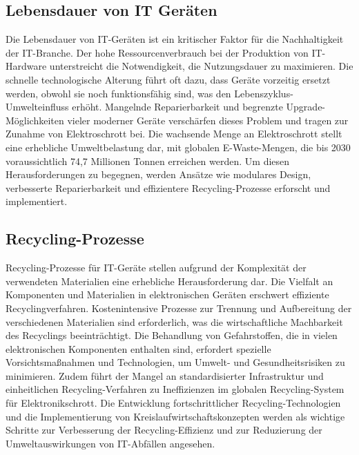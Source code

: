 \documentclass[12pt]{article}
\begin{document}
\subsection{Lebensdauer von IT Geräten}
Die Lebensdauer von IT-Geräten ist ein kritischer Faktor für die Nachhaltigkeit der IT-Branche. Der hohe Ressourcenverbrauch bei der Produktion von IT-Hardware unterstreicht die Notwendigkeit, die Nutzungsdauer zu maximieren\cite{tomlinson2010}. Die schnelle technologische Alterung führt oft dazu, dass Geräte vorzeitig ersetzt werden, obwohl sie noch funktionsfähig sind, was den Lebenszyklus-Umwelteinfluss erhöht\cite{belkhir2018}. Mangelnde Reparierbarkeit und begrenzte Upgrade-Möglichkeiten vieler moderner Geräte verschärfen dieses Problem und tragen zur Zunahme von Elektroschrott bei\cite{baldé2017}. Die wachsende Menge an Elektroschrott stellt eine erhebliche Umweltbelastung dar, mit globalen E-Waste-Mengen, die bis 2030 voraussichtlich 74,7 Millionen Tonnen erreichen werden\cite{baldé2017}. Um diesen Herausforderungen zu begegnen, werden Ansätze wie modulares Design, verbesserte Reparierbarkeit und effizientere Recycling-Prozesse erforscht und implementiert\cite{pohl2019}.

\subsection{Recycling-Prozesse}
Recycling-Prozesse für IT-Geräte stellen aufgrund der Komplexität der verwendeten Materialien eine erhebliche Herausforderung dar. Die Vielfalt an Komponenten und Materialien in elektronischen Geräten erschwert effiziente Recyclingverfahren\cite{baldé2017}. Kostenintensive Prozesse zur Trennung und Aufbereitung der verschiedenen Materialien sind erforderlich, was die wirtschaftliche Machbarkeit des Recyclings beeinträchtigt\cite{tomlinson2010}. Die Behandlung von Gefahrstoffen, die in vielen elektronischen Komponenten enthalten sind, erfordert spezielle Vorsichtsmaßnahmen und Technologien, um Umwelt- und Gesundheitsrisiken zu minimieren\cite{murugesan2008}. Zudem führt der Mangel an standardisierter Infrastruktur und einheitlichen Recycling-Verfahren zu Ineffizienzen im globalen Recycling-System für Elektronikschrott\cite{baldé2017}. Die Entwicklung fortschrittlicher Recycling-Technologien und die Implementierung von Kreislaufwirtschaftskonzepten werden als wichtige Schritte zur Verbesserung der Recycling-Effizienz und zur Reduzierung der Umweltauswirkungen von IT-Abfällen angesehen\cite{geissdoerfer2010}.
\end{document}
